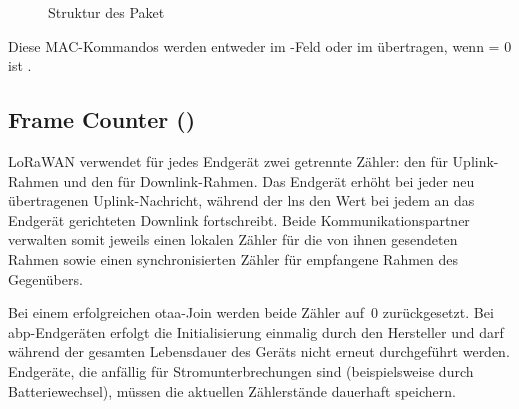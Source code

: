 \begin{itemize}
\begin{figure}[H]
			\caption{Struktur des  Paket \cite{LoRaAlliance:2020b}}
		\end{figure}
	\end{itemize}
	
	\vspace{0.5cm}
	Diese MAC-Kommandos werden entweder im -Feld oder im  übertragen, 
	wenn  = 0 ist \cite{LoRaAlliance:2020b}.
	
\subsection{Frame Counter ()}
	LoRaWAN verwendet für jedes Endgerät zwei getrennte Zähler: den  für Uplink-Rahmen und den  für Downlink-Rahmen. Das Endgerät erhöht  bei jeder neu übertragenen Uplink-Nachricht, während der \ac{lns} den Wert  bei jedem an das Endgerät gerichteten Downlink fortschreibt. Beide Kommunikationspartner verwalten somit jeweils einen lokalen Zähler für die von ihnen gesendeten Rahmen sowie einen synchronisierten Zähler für empfangene Rahmen des Gegenübers.

	Bei einem erfolgreichen \ac{otaa}-Join werden beide Zähler auf~0 zurückgesetzt. Bei \ac{abp}-Endgeräten erfolgt die Initialisierung einmalig durch den Hersteller und darf während der gesamten Lebensdauer des Geräts nicht erneut durchgeführt werden. Endgeräte, die anfällig für Stromunterbrechungen sind (beispielsweise durch Batteriewechsel), müssen die aktuellen Zählerstände dauerhaft speichern.

